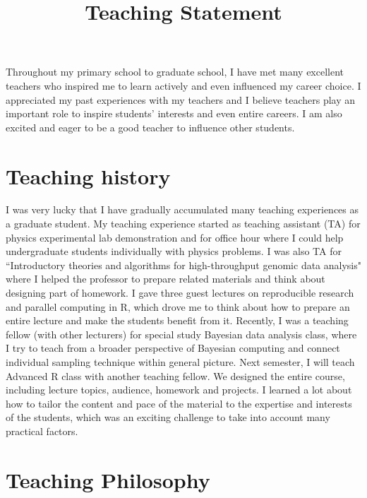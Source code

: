 \documentclass[12pt]{amsart} \usepackage{amssymb}
\title[]{Teaching Statement}
\begin{document}
\maketitle
\thispagestyle{empty}

Throughout my primary school to graduate school,
I have met many excellent teachers who inspired me to learn actively and even influenced my career choice. 
I appreciated my past experiences with my teachers 
and I believe teachers play an important role to inspire students' interests and even entire careers.
I am also excited and eager to be a good teacher to influence other students.

\section{Teaching history}

I was very lucky that I have gradually accumulated many teaching experiences as a graduate student.
My teaching experience started as teaching assistant (TA) for physics experimental lab demonstration 
and for office hour where I could help undergraduate students individually with physics problems.
I was also TA for ``Introductory theories and algorithms for high-throughput genomic data analysis"
where I helped the professor to prepare related materials and think about designing part of homework.
I gave three guest lectures on reproducible research and parallel computing in R,
which drove me to think about how to prepare an entire lecture and make the students benefit from it.
Recently, I was a teaching fellow (with other lecturers) for special study Bayesian data analysis class,
where I try to teach from a broader perspective of Bayesian computing and connect individual sampling technique within general picture.
Next semester, I will teach Advanced R class with another teaching fellow.
We designed the entire course, including lecture topics, audience, homework and projects. 
I learned a lot about how to tailor the content and pace of the material to the expertise and interests of the students, 
which was an exciting challenge to take into account many practical factors.

\section{Teaching Philosophy}
\end{document}
